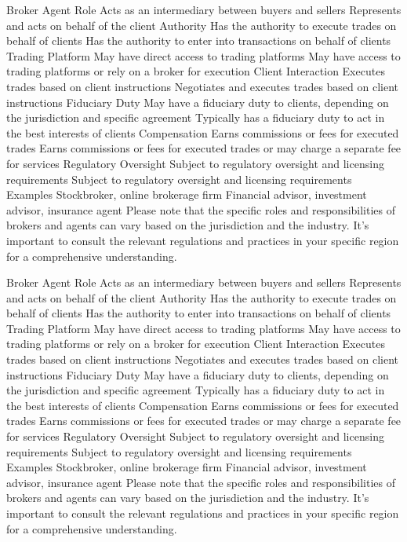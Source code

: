 \documentclass[11pt]{article}
\begin{document}
Broker	Agent
Role	Acts as an intermediary between buyers and sellers	Represents and acts on behalf of the client
Authority	Has the authority to execute trades on behalf of clients	Has the authority to enter into transactions on behalf of clients
Trading Platform	May have direct access to trading platforms	May have access to trading platforms or rely on a broker for execution
Client Interaction	Executes trades based on client instructions	Negotiates and executes trades based on client instructions
Fiduciary Duty	May have a fiduciary duty to clients, depending on the jurisdiction and specific agreement	Typically has a fiduciary duty to act in the best interests of clients
Compensation	Earns commissions or fees for executed trades	Earns commissions or fees for executed trades or may charge a separate fee for services
Regulatory Oversight	Subject to regulatory oversight and licensing requirements	Subject to regulatory oversight and licensing requirements
Examples	Stockbroker, online brokerage firm	Financial advisor, investment advisor, insurance agent
Please note that the specific roles and responsibilities of brokers and agents can vary based on the jurisdiction and the industry. It's important to consult the relevant regulations and practices in your specific region for a comprehensive understanding.




Broker	Agent
Role	Acts as an intermediary between buyers and sellers	Represents and acts on behalf of the client
Authority	Has the authority to execute trades on behalf of clients	Has the authority to enter into transactions on behalf of clients
Trading Platform	May have direct access to trading platforms	May have access to trading platforms or rely on a broker for execution
Client Interaction	Executes trades based on client instructions	Negotiates and executes trades based on client instructions
Fiduciary Duty	May have a fiduciary duty to clients, depending on the jurisdiction and specific agreement	Typically has a fiduciary duty to act in the best interests of clients
Compensation	Earns commissions or fees for executed trades	Earns commissions or fees for executed trades or may charge a separate fee for services
Regulatory Oversight	Subject to regulatory oversight and licensing requirements	Subject to regulatory oversight and licensing requirements
Examples	Stockbroker, online brokerage firm	Financial advisor, investment advisor, insurance agent
Please note that the specific roles and responsibilities of brokers and agents can vary based on the jurisdiction and the industry. It's important to consult the relevant regulations and practices in your specific region for a comprehensive understanding.
\end{document}

